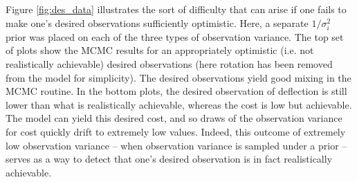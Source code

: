 \documentclass{article}
\begin{document}
Figure \ref{fig:des_data} illustrates the sort of difficulty that can arise if one fails to make one's desired observations sufficiently optimistic. Here, a separate $1/\sigma^2_i$ prior was placed on each of the three types of observation variance. The top set of plots show the MCMC results for an appropriately optimistic (i.e. not realistically achievable) desired observations (here rotation has been removed from the model for simplicity). The desired observations yield good mixing in the MCMC routine. In the bottom plots, the desired observation of deflection is still lower than what is realistically achievable, whereas the cost is low but achievable. The model can yield this desired cost, and so draws of the observation variance for cost quickly drift to extremely low values. Indeed, this outcome of extremely low observation variance -- when observation variance is sampled under a prior -- serves as a way to detect that one's desired observation is in fact realistically achievable.
\end{document}
